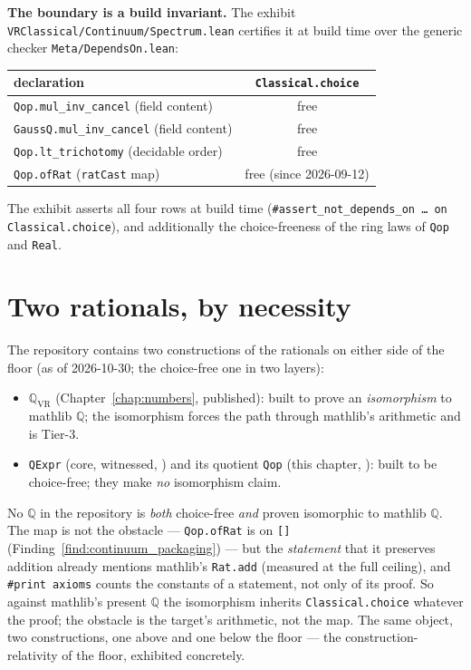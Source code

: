 \textbf{The boundary is a build invariant.}  The exhibit
\texttt{VRClassical/Continuum/Spectrum.lean} certifies it at build time over the generic
checker \texttt{Meta/DependsOn.lean}:

\begin{center}
\begin{tabular}{lc}
\textbf{declaration} & \texttt{Classical.choice} \\
\hline
\texttt{Qop.mul\_inv\_cancel} (field content)    & free \\
\texttt{GaussQ.mul\_inv\_cancel} (field content) & free \\
\texttt{Qop.lt\_trichotomy} (decidable order)    & free \\
\texttt{Qop.ofRat} (\texttt{ratCast} map)      & free (since 2026-09-12) \\
\end{tabular}
\end{center}

\noindent The exhibit asserts all four rows at build time
(\texttt{\#assert\_not\_depends\_on \ldots\ on Classical.choice}), and additionally the
choice-freeness of the ring laws of \texttt{Qop} and \texttt{Real}.

\section{Two rationals, by necessity}
\label{sec:continuum_two_q}

The repository contains two constructions of the rationals on either side of the
floor (as of 2026-10-30; the choice-free one in two layers):
\begin{itemize}
  \item $\mathbb{Q}_{\mathrm{VR}}$ (Chapter~\ref{chap:numbers}, published): built to
  prove an \emph{isomorphism} to mathlib $\mathbb{Q}$; the isomorphism forces the path
  through mathlib's arithmetic and is Tier-3.
  \item \texttt{QExpr} (core, witnessed, \axiomprofile{[]}) and its quotient
  \texttt{Qop} (this chapter, ): built to be choice-free;
  they make \emph{no} isomorphism claim.
\end{itemize}
No $\mathbb{Q}$ in the repository is \emph{both} choice-free \emph{and} proven
isomorphic to mathlib $\mathbb{Q}$.  The map is not the obstacle --- \texttt{Qop.ofRat}
is on \texttt{[]} (Finding~\ref{find:continuum_packaging}) --- but the
\emph{statement} that it preserves addition already mentions mathlib's \texttt{Rat.add}
(measured at the full ceiling), and \texttt{\#print axioms} counts the constants of a
statement, not only of its proof.  So against mathlib's present $\mathbb{Q}$ the
isomorphism inherits \texttt{Classical.choice} whatever the proof; the obstacle is the
target's arithmetic, not the map.  The same object, two constructions, one above and one below the floor ---
the construction-relativity of the floor, exhibited concretely.

